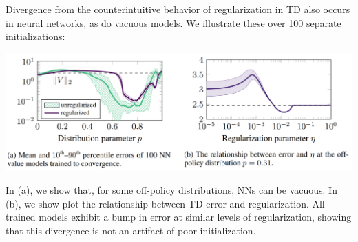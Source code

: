 Divergence from the counterintuitive behavior of regularization in TD also occurs in neural networks, as do vacuous models. We illustrate these over 100 separate initializations:
\begin{center}
    \includegraphics[scale=0.4]{parts/nn/nn2.png}
\end{center}
In (a), we show that, for some off-policy distributions, NNs can be vacuous. In (b), we show plot the relationship between TD error and regularization. All trained models exhibit a bump in error at similar levels of regularization, showing that this divergence is not an artifact of poor initialization.
